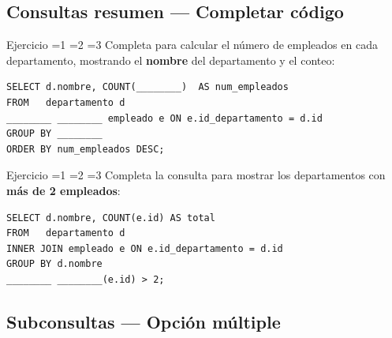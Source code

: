 \documentclass[12pt, a4paper]{article}
\newcommand{\estrella}{{\color{Goldenrod}\faStarSolid}}
\newcommand{\estrellavacia}{{\color{gray!45}\faStarSolid}}
\newcommand{\nivel}[1]{%
  \ifnum#1=1\estrella\estrellavacia\estrellavacia\fi
  \ifnum#1=2\estrella\estrella\estrellavacia\fi
  \ifnum#1=3\estrella\estrella\estrella\fi
}
\newcounter{numej}
\newcommand{\ej}{\stepcounter{numej}\thenumej}
\begin{document}
\subsection{Consultas resumen — Completar código}

\begin{ejercicio}{Ejercicio \ej}{\nivel{2}}
Completa para calcular el número de empleados en cada departamento,
mostrando el \textbf{nombre} del departamento y el conteo:

\begin{lstlisting}
SELECT d.nombre, COUNT(________)  AS num_empleados
FROM   departamento d
________ ________ empleado e ON e.id_departamento = d.id
GROUP BY ________
ORDER BY num_empleados DESC;
\end{lstlisting}
\end{ejercicio}

\begin{ejercicio}{Ejercicio \ej}{\nivel{3}}
Completa la consulta para mostrar los departamentos con
\textbf{más de 2 empleados}:

\begin{lstlisting}
SELECT d.nombre, COUNT(e.id) AS total
FROM   departamento d
INNER JOIN empleado e ON e.id_departamento = d.id
GROUP BY d.nombre
________ ________(e.id) > 2;
\end{lstlisting}
\end{ejercicio}

\subsection{Subconsultas — Opción múltiple}
\end{document}
